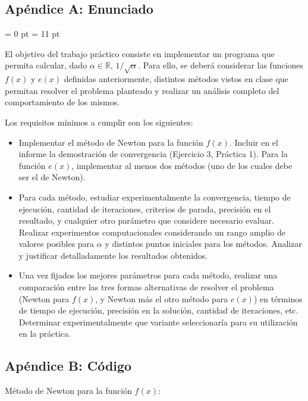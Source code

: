 \subsection{Apéndice A: Enunciado}

\parindent = 0 pt
\parskip = 11 pt

El objetivo del trabajo pr\'actico consiste en implementar un programa que permita calcular, dado $\alpha \in
\mathbb{R}$, $1/\sqrt{\alpha}$. Para ello, se deber\'a considerar las funciones $f(x)$ y $e(x)$ definidas
anteriormente, distintos m\'etodos vistos en clase que permitan resolver el problema planteado y realizar un an\'alisis
completo del comportamiento de los mismos. 

Los requisitos m\'inimos a cumplir son los siguientes:

\begin{itemize}
\item Implementar el m\'etodo de Newton para la funci\'on $f(x)$. Incluir en el informe la demostraci\'on de
convergencia (Ejercicio 3, Pr\'actica 1). Para la funci\'on $e(x)$, implementar al menos dos m\'etodos (uno de los
cuales debe ser el de Newton).   
\item Para cada m\'etodo, estudiar experimentalmente la convergencia, tiempo de ejecuci\'on, cantidad de iteraciones,
criterios de parada, precisi\'on en el resultado, y cualquier otro par\'ametro que considere necesario evaluar. Realizar experimentos
computacionales considerando un rango amplio de valores posibles para $\alpha$ y distintos puntos iniciales
para los m\'etodos. Analizar y justificar detalladamente los resultados obtenidos.
\item Una vez fijados los mejores par\'ametros para cada m\'etodo, realizar una comparaci\'on entre las tres formas
alternativas de resolver el problema (Newton para $f(x)$, y Newton m\'as el otro m\'etodo para $e(x)$) en t\'erminos de
tiempo de ejecuci\'on, precisi\'on en la soluci\'on, cantidad de iteraciones, etc. Determinar experimentalmente que
variante seleccionar\'ia para su utilizaci\'on en la pr\'actica.
\end{itemize}

\subsection{Apéndice B: Código}

M\'etodo de Newton para la funci\'on $f(x)$:

